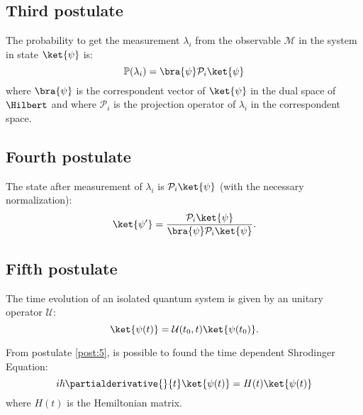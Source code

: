     \subsection{Third postulate}
    \begin{postulate}
        The probability to get the measurement $\lambda_i$ from the observable 
        $\mathcal{M}$ in the system in state $\ket{\psi}$ is:
        \begin{equation*}
            \mathbb{P}(\lambda_i)=\bra{\psi}\mathcal{P}_i\ket{\psi}
        \end{equation*}
        where $\bra{\psi}$ is the correspondent vector of $\ket{\psi}$ in the 
        dual space of $\Hilbert$ and where $\mathcal{P}_i$ is the projection operator
        of $\lambda_i$ in the correspondent space.
        \label{post:3}
    \end{postulate}

    \subsection{Fourth postulate}
    \begin{postulate}
        The state after measurement of $\lambda_i$ is $\mathcal{P}_i\ket{\psi}$ (with the
        necessary normalization):
        \begin{equation*}
            \ket{\psi'}=\frac{\mathcal{P}_i\ket{\psi}}{\bra{\psi}\mathcal{P}_i\ket{\psi}}.
        \end{equation*}
        \label{post:4}
    \end{postulate}

    \subsection{Fifth postulate}
    \begin{postulate}
        The time evolution of an isolated quantum system is given by an unitary operator
        $\mathcal{U}$:
        \begin{equation*}
            \ket{\psi(t)}=\mathcal{U}(t_0,t)\ket{\psi(t_0)}.
        \end{equation*}
        \label{post:5}
    \end{postulate}
    \begin{observation*}
        From postulate \ref{post:5}, is possible to found the time dependent Shrodinger Equation:
        \begin{equation*}
            i\hbar\partialderivative{}{t}\ket{\psi(t)}=H(t)\ket{\psi(t)}
        \end{equation*}
        where $H(t)$ is the Hemiltonian matrix.
    \end{observation*}

